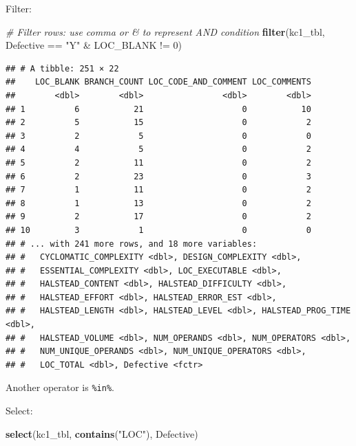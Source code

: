 \documentclass[]{book}
\newenvironment{Shaded}{\begin{snugshade}}{\end{snugshade}}
\newcommand{\KeywordTok}[1]{\textcolor[rgb]{0.13,0.29,0.53}{\textbf{{#1}}}}
\newcommand{\DecValTok}[1]{\textcolor[rgb]{0.00,0.00,0.81}{{#1}}}
\newcommand{\StringTok}[1]{\textcolor[rgb]{0.31,0.60,0.02}{{#1}}}
\newcommand{\CommentTok}[1]{\textcolor[rgb]{0.56,0.35,0.01}{\textit{{#1}}}}
\newcommand{\NormalTok}[1]{{#1}}
\begin{document}
Filter:

\begin{Shaded}
\begin{Highlighting}[]
\CommentTok{# Filter rows: use comma or & to represent AND condition}
\KeywordTok{filter}\NormalTok{(kc1_tbl, Defective ==}\StringTok{ "Y"} \NormalTok{&}\StringTok{ }\NormalTok{LOC_BLANK !=}\StringTok{ }\DecValTok{0}\NormalTok{)}
\end{Highlighting}
\end{Shaded}

\begin{verbatim}
## # A tibble: 251 × 22
##    LOC_BLANK BRANCH_COUNT LOC_CODE_AND_COMMENT LOC_COMMENTS
##        <dbl>        <dbl>                <dbl>        <dbl>
## 1          6           21                    0           10
## 2          5           15                    0            2
## 3          2            5                    0            0
## 4          4            5                    0            2
## 5          2           11                    0            2
## 6          2           23                    0            3
## 7          1           11                    0            2
## 8          1           13                    0            2
## 9          2           17                    0            2
## 10         3            1                    0            0
## # ... with 241 more rows, and 18 more variables:
## #   CYCLOMATIC_COMPLEXITY <dbl>, DESIGN_COMPLEXITY <dbl>,
## #   ESSENTIAL_COMPLEXITY <dbl>, LOC_EXECUTABLE <dbl>,
## #   HALSTEAD_CONTENT <dbl>, HALSTEAD_DIFFICULTY <dbl>,
## #   HALSTEAD_EFFORT <dbl>, HALSTEAD_ERROR_EST <dbl>,
## #   HALSTEAD_LENGTH <dbl>, HALSTEAD_LEVEL <dbl>, HALSTEAD_PROG_TIME <dbl>,
## #   HALSTEAD_VOLUME <dbl>, NUM_OPERANDS <dbl>, NUM_OPERATORS <dbl>,
## #   NUM_UNIQUE_OPERANDS <dbl>, NUM_UNIQUE_OPERATORS <dbl>,
## #   LOC_TOTAL <dbl>, Defective <fctr>
\end{verbatim}

Another operator is \texttt{\%in\%}.

Select:

\begin{Shaded}
\begin{Highlighting}[]
\KeywordTok{select}\NormalTok{(kc1_tbl, }\KeywordTok{contains}\NormalTok{(}\StringTok{"LOC"}\NormalTok{), Defective)}
\end{Highlighting}
\end{Shaded}
\end{document}
